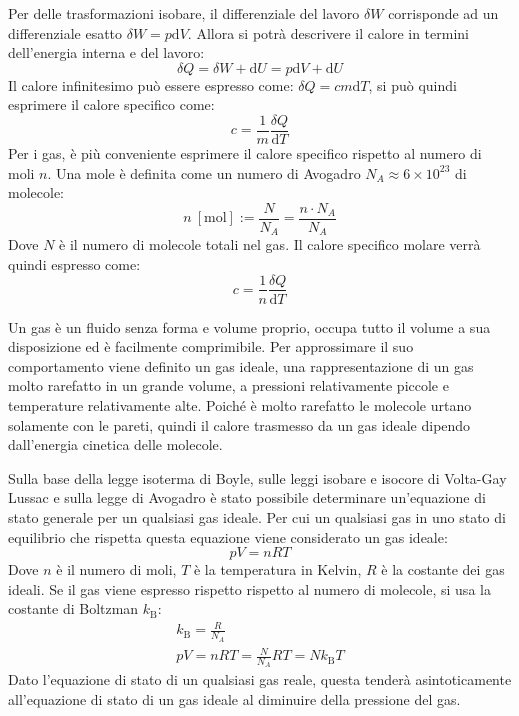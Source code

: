 \documentclass{article}
\newcommand{\df}{\mathrm{d}}
\numberwithin{equation}{subsection}
\begin{document}
Per delle trasformazioni isobare, il differenziale del lavoro $\delta W$ corrisponde ad un differenziale esatto $\delta W=p\df V$. 
Allora si potrà descrivere il calore in termini dell'energia 
interna e del lavoro:
\begin{equation*}
    \delta Q=\delta W+\df U=p\df V+\df U
\end{equation*}
Il calore infinitesimo può essere espresso come: $\delta Q=cm\df T$, 
si può quindi esprimere il calore specifico come:
\begin{equation*}
    c=\displaystyle\frac{1}{m}\frac{\delta Q}{\df T}
\end{equation*}
Per i gas, è più conveniente esprimere il calore specifico 
rispetto al numero di moli $n$. Una mole è definita come un numero 
di Avogadro $N_A\approx 6\times10^{23}$ di molecole: 
\begin{equation*}
    n\:[\mathrm{mol}]:=\displaystyle\frac{N}{N_A}=\frac{n\cdot N_A}{N_A}
\end{equation*}
Dove $N$ è il numero di molecole totali nel gas. Il calore specifico molare verrà quindi espresso come: 
\begin{equation*}
    c=\displaystyle\frac{1}{n}\frac{\delta Q}{\df T}
\end{equation*}



Un gas è un fluido senza forma e volume proprio, occupa tutto il volume a sua disposizione ed è facilmente comprimibile. 
Per approssimare il suo comportamento viene definito 
un gas ideale, una rappresentazione di un gas molto 
rarefatto in un grande volume, a pressioni relativamente piccole 
e temperature relativamente alte. Poiché è molto rarefatto le 
molecole urtano solamente con le pareti, quindi il calore 
trasmesso da un gas ideale dipendo dall'energia cinetica delle 
molecole. 

Sulla base della legge isoterma di Boyle, sulle leggi isobare e isocore di Volta-Gay Lussac e sulla legge di Avogadro è stato possibile determinare un'equazione di stato 
generale per un qualsiasi gas ideale. Per cui un qualsiasi gas in uno stato di equilibrio che rispetta questa equazione viene considerato un gas ideale: 
\begin{equation}
    pV=nRT
\end{equation}
Dove $n$ è il numero di moli, $T$ è la temperatura in Kelvin, 
$R$ è la costante dei gas ideali. Se il gas viene espresso 
rispetto rispetto al numero di molecole, si usa la costante di 
Boltzman $k_{\mathrm{B}}$:
\begin{gather*}
    k_\mathrm{B}=\displaystyle\frac{R}{N_A}\\
    pV=nRT=\displaystyle\frac{N}{N_A}RT=Nk_\mathrm{B}T
\end{gather*} 
Dato l'equazione di stato di un qualsiasi gas reale, questa tenderà asintoticamente all'equazione di stato di un gas ideale al diminuire della pressione del gas. 
\end{document}
